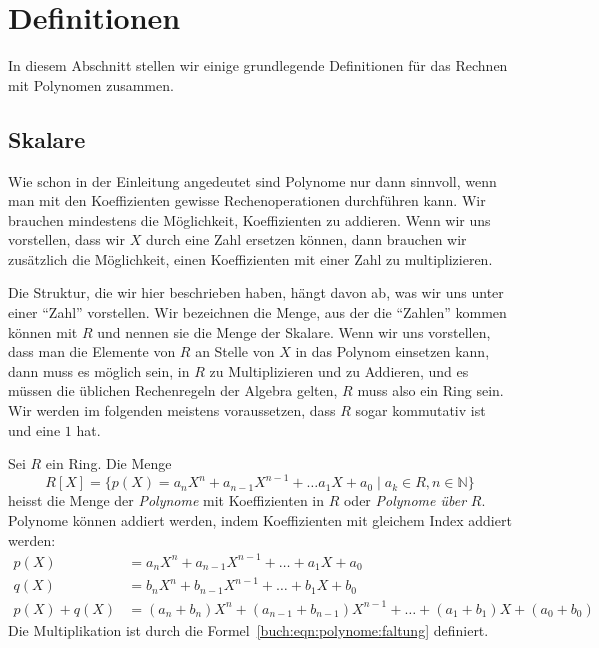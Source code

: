 %
%
%
\section{Definitionen
\label{buch:section:polynome:definitionen}}
In diesem Abschnitt stellen wir einige grundlegende Definitionen für das 
Rechnen mit Polynomen zusammen.

%
%
\subsection{Skalare
\label{buch:subsection:polynome:skalare}}
Wie schon in der Einleitung angedeutet sind Polynome nur dann sinnvoll,
wenn man mit den Koeffizienten gewisse Rechenoperationen durchführen kann.
Wir brauchen mindestens die Möglichkeit, Koeffizienten zu addieren.
Wenn wir uns vorstellen, dass wir $X$ durch eine Zahl ersetzen können,
dann brauchen wir zusätzlich die Möglichkeit, einen Koeffizienten mit einer
Zahl zu multiplizieren.

Die Struktur, die wir hier beschrieben haben, hängt davon ab, was wir uns
unter einer ``Zahl'' vorstellen.
Wir bezeichnen die Menge, aus der die ``Zahlen'' kommen können mit $R$ und
nennen sie die Menge der Skalare.
%
Wenn wir uns vorstellen, dass man die Elemente von $R$ an Stelle von $X$ 
in das Polynom einsetzen kann, dann muss es möglich sein, in $R$ zu
Multiplizieren und zu Addieren, und es müssen die üblichen Rechenregeln
der Algebra gelten, $R$ muss also ein Ring sein.
%
Wir werden im folgenden meistens voraussetzen, dass $R$ sogar kommutativ
ist und eine $1$ hat.

\begin{definition}
Sei $R$ ein Ring.
Die Menge
\[
R[X]
=
\{
p(X) = a_nX^n+a_{n-1}X^{n-1} + \dots a_1X+a_0\;|\; a_k\in R, n\in\mathbb{N}
\}
\]
heisst die Menge der {\em Polynome} mit Koeffizienten in $R$ 
oder
{\em Polynome über} $R$.
%
Polynome können addiert werden, indem Koeffizienten mit gleichem Index
addiert werden:
\begin{align*}
p(X) &= a_nX^n + a_{n-1}X^{n-1} + \dots + a_1X + a_0\\
q(X) &= b_nX^n + b_{n-1}X^{n-1} + \dots + b_1X + b_0\\
p(X)+q(X)
&=
(a_n+b_n)X^n
+
(a_{n-1}+b_{n-1})X^{n-1}
+
\dots
+
(a_1+b_1)X
+
(a_0+b_0)
\end{align*}
Die Multiplikation ist durch die Formel~\eqref{buch:eqn:polynome:faltung}
definiert.
\end{definition}


